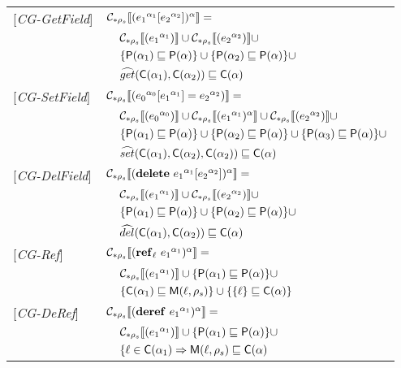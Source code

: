 \begin{table}[htb]
\begin{tabular} {l l l l}
{[\textit{CG-GetField}]}&\multicolumn{3}{l}{$\genl {\lookup {\lbt 1} {\lbt 2}} = $}\\
&&\multicolumn{2}{l}{$ \gen {\lbt1} \cup \gen {\lbt 2} \cup$}\\
&&\multicolumn{2}{l}{$\braces{\Pel(\all_1) \sqsubseteq \Pel(\all)} \cup \braces{\Pel(\all_2) \sqsubseteq \Pel(\all)} \cup$} \\
&&\multicolumn{2}{l}{$\widehat{get} (\Cel(\all_1), \Cel(\all_2)) \sqsubseteq \Cel(\all)$} \\
{[\textit{CG-SetField}]}&\multicolumn{3}{l}{$\gen {\store {\lbt 0} {\lbt 1} {\lbt 2}} = $}\\
&&\multicolumn{2}{l}{$ \gen {\lbt 0} \cup \genl {\lbt 1} \cup \gen {\lbt 2} \cup $}\\
&&\multicolumn{2}{l}{$\braces{\Pel(\all_1) \sqsubseteq \Pel(\all)} \cup\braces{\Pel(\all_2) \sqsubseteq \Pel(\all)} \cup\braces{\Pel(\all_3) \sqsubseteq \Pel(\all)} \cup$} \\
&&\multicolumn{2}{l}{$\widehat{set} (\Cel(\all_1), \Cel(\all_2), \Cel(\all_2)) \sqsubseteq \Cel(\all)$} \\
{[\textit{CG-DelField}]}&\multicolumn{3}{l}{$\genl {\delete {\lbt 1} {\lbt 2}} = $}\\ 
&&\multicolumn{2}{l}{$ \gen {\lbt1} \cup \gen {\lbt 2} \cup$}\\
&&\multicolumn{2}{l}{$\braces{\Pel(\all_1) \sqsubseteq \Pel(\all)} \cup \braces{\Pel(\all_2) \sqsubseteq \Pel(\all)} \cup$} \\
&&\multicolumn{2}{l}{$\widehat{del} (\Cel(\all_1), \Cel(\all_2)) \sqsubseteq \Cel(\all)$}\\
{[\textit{CG-Ref}]}&\multicolumn{3}{l}{$ \genl {\newref {\ell} {\lbt 1}} = $}\\
&&\multicolumn{2}{l}{$\gen {\lbt 1} \cup\braces{\Pel(\all_1) \sqsubseteq \Pel(\all)} \cup$}\\
&&\multicolumn{2}{l}{$\braces{\Cel(\all_1) \sqsubseteq \Mel(\ell, \rho_s)} \cup \braces{\{\ell\} \sqsubseteq \Cel(\all)}$}\\
{[\textit{CG-DeRef}]}&\multicolumn{3}{l}{$\genl {\deref {\lbt 1}} = $}\\
&&\multicolumn{2}{l}{$ \gen {\lbt 1} \cup\braces{\Pel(\all_1) \sqsubseteq \Pel(\all)} \cup$}\\
&&\multicolumn{2}{l}{$\{\ell \in \Cel(\all_1) \Rightarrow \Mel(\ell, \rho_s) \sqsubseteq \Cel(\all)$} \\

\end{tabular}
\end{table}
